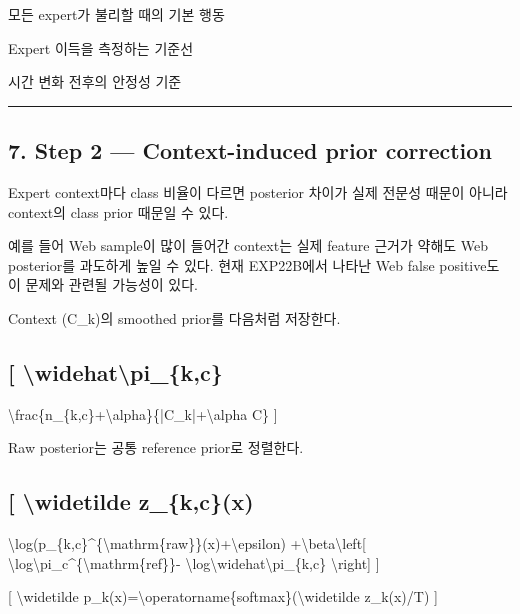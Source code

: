 \par\noindent \textbullet\enspace 모든 expert가 불리할 때의 기본 행동


\par\noindent \textbullet\enspace Expert 이득을 측정하는 기준선


\par\noindent \textbullet\enspace 시간 변화 전후의 안정성 기준



\medskip\hrule\medskip
\subsection{7. Step 2 — Context-induced prior correction}
Expert context마다 class 비율이 다르면 posterior 차이가 실제 전문성 때문이 아니라 context의 class prior 때문일 수 있다.

예를 들어 Web sample이 많이 들어간 context는 실제 feature 근거가 약해도 Web posterior를 과도하게 높일 수 있다. 현재 EXP22B에서 나타난 Web false positive도 이 문제와 관련될 가능성이 있다.

Context (C\_\allowbreak{}k)의 smoothed prior를 다음처럼 저장한다.

\subsection{[ \textbackslash{}widehat\textbackslash{}pi\_\allowbreak{}\{k,c\}}
\textbackslash{}frac\{n\_\allowbreak{}\{k,c\}+\allowbreak{}\textbackslash{}alpha\}\{|C\_\allowbreak{}k|+\allowbreak{}\textbackslash{}alpha C\} ]

Raw posterior는 공통 reference prior로 정렬한다.

\subsection{[ \textbackslash{}widetilde z\_\allowbreak{}\{k,c\}(x)}
\textbackslash{}log(p\_\allowbreak{}\{k,c\}\textasciicircum{}\{\textbackslash{}mathrm\{raw\}\}(x)+\allowbreak{}\textbackslash{}epsilon) +\allowbreak{}\textbackslash{}beta\textbackslash{}left[ \textbackslash{}log\textbackslash{}pi\_\allowbreak{}c\textasciicircum{}\{\textbackslash{}mathrm\{ref\}\}- \textbackslash{}log\textbackslash{}widehat\textbackslash{}pi\_\allowbreak{}\{k,c\} \textbackslash{}right] ]

[ \textbackslash{}widetilde p\_\allowbreak{}k(x)=\allowbreak{}\textbackslash{}operatorname\{softmax\}(\textbackslash{}widetilde z\_\allowbreak{}k(x)/\allowbreak{}T) ]

